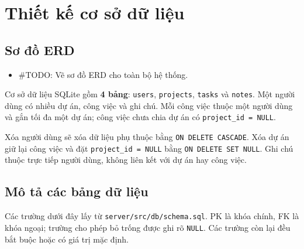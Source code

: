 \section{Thiết kế cơ sở dữ liệu}


\subsection{Sơ đồ ERD}
\begin{itemize}
  \item \#TODO: Vẽ sơ đồ ERD cho toàn bộ hệ thống.
\end{itemize}

Cơ sở dữ liệu SQLite gồm \textbf{4 bảng}: \texttt{users}, \texttt{projects},
\texttt{tasks} và \texttt{notes}. Một người dùng có nhiều dự án, công việc và
ghi chú. Mỗi công việc thuộc một người dùng và gắn tối đa một dự án;
công việc chưa chia dự án có \texttt{project\_id = NULL}.

Xóa người dùng sẽ xóa dữ liệu phụ thuộc bằng \texttt{ON DELETE CASCADE}.
Xóa dự án giữ lại công việc và đặt \texttt{project\_id = NULL} bằng
\texttt{ON DELETE SET NULL}. Ghi chú thuộc trực tiếp người dùng,
không liên kết với dự án hay công việc.

\subsection{Mô tả các bảng dữ liệu}
Các trường dưới đây lấy từ \texttt{server/src/db/schema.sql}.
PK là khóa chính, FK là khóa ngoại; trường cho phép bỏ trống được ghi rõ
\texttt{NULL}. Các trường còn lại đều bắt buộc hoặc có giá trị mặc định.

